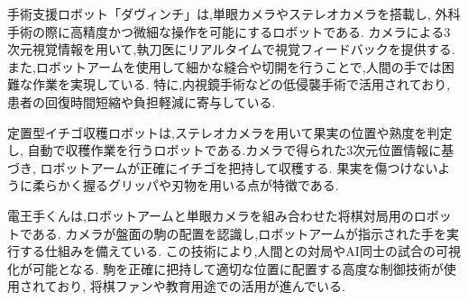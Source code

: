 手術支援ロボット「ダヴィンチ」は,単眼カメラやステレオカメラを搭載し,
外科手術の際に高精度かつ微細な操作を可能にするロボットである.
カメラによる3次元視覚情報を用いて,執刀医にリアルタイムで視覚フィードバックを提供する.
また,ロボットアームを使用して細かな縫合や切開を行うことで,人間の手では困難な作業を実現している.
特に,内視鏡手術などの低侵襲手術で活用されており,患者の回復時間短縮や負担軽減に寄与している.

定置型イチゴ収穫ロボットは,ステレオカメラを用いて果実の位置や熟度を判定し,
自動で収穫作業を行うロボットである.カメラで得られた3次元位置情報に基づき,
ロボットアームが正確にイチゴを把持して収穫する.
果実を傷つけないように柔らかく握るグリッパや刃物を用いる点が特徴である.

電王手くんは,ロボットアームと単眼カメラを組み合わせた将棋対局用のロボットである.
カメラが盤面の駒の配置を認識し,ロボットアームが指示された手を実行する仕組みを備えている.
この技術により,人間との対局やAI同士の試合の可視化が可能となる.
駒を正確に把持して適切な位置に配置する高度な制御技術が使用されており,
将棋ファンや教育用途での活用が進んでいる.
